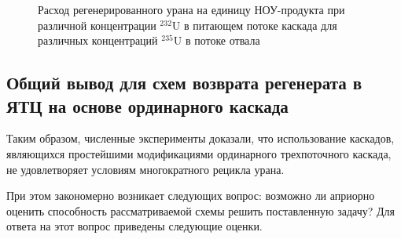 \begin{figure}[ht]
  \caption{Расход регенерированного урана на единицу НОУ-продукта  при различной концентрации $^{232}$U в питающем потоке каскада для различных концентраций $^{235}$U в потоке отвала}\label{sc3_1.second}
\end{figure}




\subsection{Общий вывод для схем возврата регенерата в ЯТЦ на основе ординарного каскада}

Таким образом, численные эксперименты доказали, что использование каскадов, являющихся простейшими модификациями ординарного трехпоточного каскада, не удовлетворяет условиям многократного рецикла урана.

При этом закономерно возникает следующих вопрос: возможно ли априорно оценить способность рассматриваемой схемы решить поставленную задачу? Для ответа на этот вопрос приведены следующие оценки.

